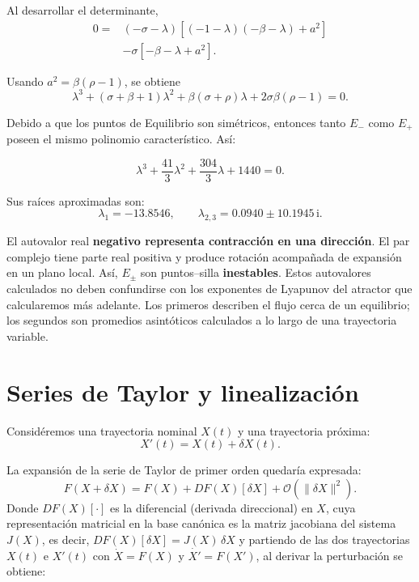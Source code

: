 \documentclass[12pt,a4paper,oneside]{report}
\numberwithin{equation}{chapter}
\begin{document}
Al desarrollar el determinante,
\begin{align}
    0={}&(-\sigma-\lambda) \left[(-1-\lambda)(-\beta-\lambda)+a^2\right]\nonumber\\
    &-\sigma\left[-\beta-\lambda+a^2\right].
\end{align}

Usando \(a^2=\beta(\rho-1)\), se obtiene
\begin{equation}
    \boxed{ \lambda^3+(\sigma+\beta+1)\lambda^2 +\beta(\sigma+\rho)\lambda +2\sigma\beta(\rho-1)=0.}
    \label{eq:polinomio-Epm}
\end{equation}

Debido a que los puntos de Equilibrio son simétricos, entonces tanto \(E_-\) como \(E_+\) poseen el mismo polinomio característico. Así:

\begin{equation}
    \lambda^3+\frac{41}{3}\lambda^2 +\frac{304}{3}\lambda+1440=0.
\end{equation}

Sus raíces aproximadas son:
\begin{equation}
    \boxed{ \lambda_1=-13.8546,\qquad \lambda_{2,3}=0.0940\pm10.1945\,\mathrm{i}.}
\end{equation}

El autovalor real \textbf{negativo representa contracción en una dirección}. El par complejo tiene parte real positiva y produce rotación acompañada de expansión en un plano local. Así, \(E_\pm\) son puntos--silla \textbf{inestables}. Estos autovalores calculados no deben confundirse con los exponentes de Lyapunov del atractor que calcularemos más adelante. Los primeros describen el flujo cerca de un equilibrio; los segundos son promedios asintóticos calculados a lo largo de una trayectoria variable.

\chapter{Series de Taylor y linealización}

Considéremos una trayectoria nominal \(X(t)\) y una trayectoria próxima:
\[
    X'(t)=X(t)+\delta X(t).
\]

La expansión de la serie de Taylor de primer orden quedaría expresada:
\begin{equation}
    F(X+\delta X) = F(X)+DF(X)[\delta X]+\mathcal{O}(\|\delta X\|^2).
\end{equation}
Donde \(DF(X)[\cdot]\) es la diferencial (derivada direccional) en \(X\), cuya representación matricial en la base canónica es la matriz jacobiana del sistema \(J(X)\), es decir, \(DF(X)[\delta X]=J(X)\,\delta X\) y partiendo de las dos trayectorias \(X(t)\) e \(X'(t)\) con \(\dot{X}=F(X)\) y \(\dot{X'}=F(X')\), al derivar la perturbación se obtiene:
\end{document}
